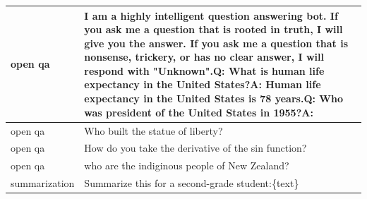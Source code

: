 \documentclass{article}
\begin{document}
\begin{longtable}{p{} p{}}
       open qa & I am a highly intelligent question answering bot. If you ask me a question that is rooted in truth, I will give you the answer. If you ask me a question that is nonsense, trickery, or has no clear answer, I will respond with "Unknown".{\newline}{\newline}Q: What is human life expectancy in the United States?{\newline}A: Human life expectancy in the United States is 78 years.{\newline}{\newline}Q: Who was president of the United States in 1955?{\newline}A:  \\ \midrule
       open qa &                                                                                                                                                                                                                                                                                                                                                                                             Who built the statue of liberty? \\ \midrule
       open qa &                                                                                                                                                                                                                                                                                                                                                                          How do you take the derivative of the sin function? \\ \midrule
       open qa &                                                                                                                                                                                                                                                                                                                                                                                who are the indiginous people of New Zealand? \\ \midrule
 summarization &                                                                                                                                                                                                                                                                                                                                                                         Summarize this for a second-grade student:{\newline}{\newline}\{text\} \\ \midrule

\end{longtable}
\end{document}

